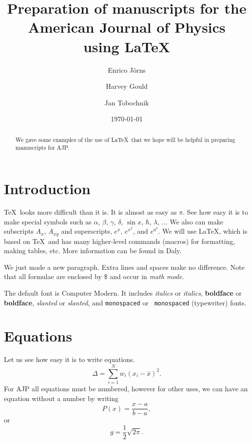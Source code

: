 \documentclass[a4paper,10pt,extramargin]{tubsartcl}
\title{}
\author{Enrico Jörns}
\newcommand{\ajp}{AJP}  %
\begin{document}
\title{Preparation of manuscripts for the American Journal of Physics\\
using \LaTeX}
\author{Harvey Gould}
\author{Jan Tobochnik}
\date{\today}

\begin{abstract}
We gave some examples of the use of \LaTeX\ that we hope will be
helpful in preparing manuscripts for \ajp.
\end{abstract}

\maketitle

\section{Introduction}
\TeX\ looks more difficult than it is. It is
almost as easy as $\pi$. See how easy it is to make special
symbols such as $\alpha$,
$\beta$, $\gamma$,
$\delta$, $\sin x$, $\hbar$, $\lambda$, $\ldots$ We also can make
subscripts
$A_{x}$, $A_{xy}$ and superscripts, $e^x$, $e^{x^2}$, and
$e^{a^b}$. We will use \LaTeX, which is based on \TeX\ and has
many higher-level commands (macros) for formatting, making
tables, etc. More information can be found in
Daly.\cite{latex}

We just made a new paragraph. Extra lines and spaces make no
difference. Note that all formulae are enclosed by
\$ and occur in \textit{math mode}.

The default font is Computer Modern. It includes \textit{italics}
or {\it italics}, \textbf{boldface} or {\bf boldface},
\textsl{slanted} or {\sl slanted}, and \texttt{monospaced} or {\tt
monospaced} (typewriter) fonts.

\section{Equations}
Let us see how easy it is to write equations.
\begin{equation}
\Delta =\sum_{i=1}^N w_i (x_i - \bar{x})^2 .
\end{equation}
For AJP all equations must be numbered, however for other uses, we can have an
equation without a number by writing
\begin{equation*}
P(x) = \frac{x - a}{b - a} , 
\end{equation*}
or
\begin{equation}
g = \frac{1}{2} \sqrt{2\pi} . \nonumber
\end{equation}
\end{document}
